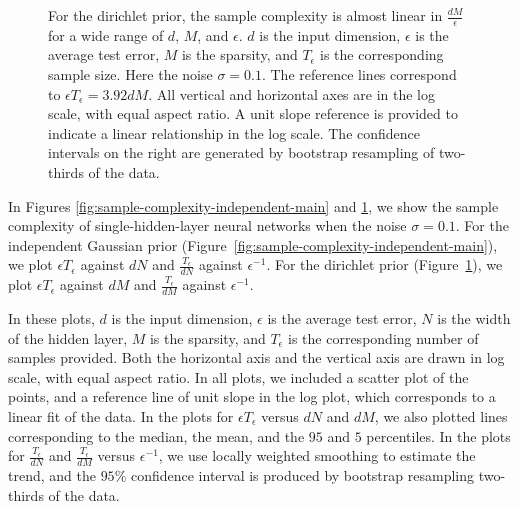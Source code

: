 \documentclass[twoside,11pt]{article}
\begin{document}
\begin{figure}[htb]
  \centering

  \caption{
    For the dirichlet prior, the sample complexity is almost linear in $\frac{dM}{\epsilon}$ 
    for a wide range of $d$, $M$, and $\epsilon$.
    $d$ is the input dimension, $\epsilon$ is the average test error, $M$ is the sparsity, and $T_\epsilon$ is the corresponding sample size.
    Here the noise $\sigma=0.1$.
    The reference lines correspond to $\epsilon T_\epsilon=3.92dM$.
    All vertical and horizontal axes are in the log scale, with equal aspect ratio.
    A unit slope reference is provided to indicate a linear relationship in the log scale.
    The confidence intervals on the right are generated by bootstrap resampling of two-thirds of the data.
  }
  \label{fig:sample-complexity-nonparametric-main}
\end{figure}

In Figures \ref{fig:sample-complexity-independent-main} and \ref{fig:sample-complexity-nonparametric-main}, we show the sample complexity of single-hidden-layer neural networks when the noise $\sigma=0.1$.
For the independent Gaussian prior (Figure~\ref{fig:sample-complexity-independent-main}),
we plot $\epsilon T_\epsilon$ against $dN$ and $\frac{T_\epsilon}{dN}$ against $\epsilon^{-1}$.
For the dirichlet prior (Figure~\ref{fig:sample-complexity-nonparametric-main}),
we plot $\epsilon T_\epsilon$ against $dM$ and $\frac{T_\epsilon}{dM}$ against $\epsilon^{-1}$.

In these plots, $d$ is the input dimension, $\epsilon$ is the average test error, $N$ is the width of the hidden layer, $M$ is the sparsity, and $T_\epsilon$ is the corresponding number of samples provided. 
Both the horizontal axis and the vertical axis are drawn in log scale, with equal aspect ratio.
In all plots, we included a scatter plot of the points, and a reference line of unit slope in the log plot, which corresponds to a linear fit of the data.
In the plots for $\epsilon T_{\epsilon}$ versus $dN$ and $dM$, we also plotted lines corresponding to the median, the mean, and the $95$ and $5$ percentiles.
In the plots for $\frac{T_{\epsilon}}{dN}$ and $\frac{T_{\epsilon}}{dM}$ versus $\epsilon^{-1}$, we use locally weighted smoothing \citep{1979-Cleveland-robust-locally-weighted-regression} to estimate the trend, and the $95\%$ confidence interval is produced by bootstrap resampling two-thirds of the data.
\end{document}
